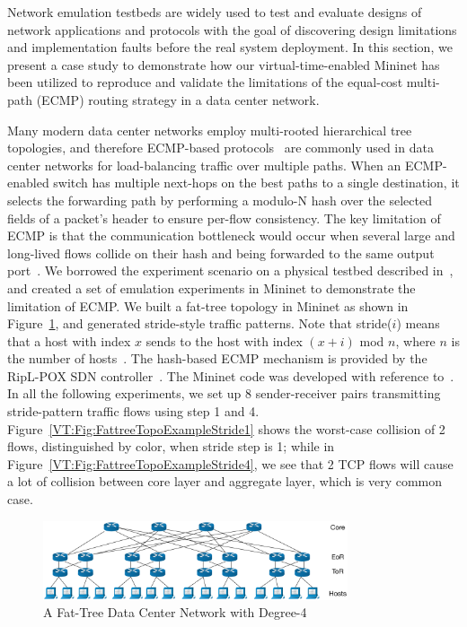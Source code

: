 \label{VT:Sec:CaseStudy}

Network emulation testbeds are widely used to test and evaluate designs of network applications and
protocols with the goal of discovering design limitations and implementation faults before the real system deployment.
In this section, we present a case study to demonstrate how our virtual-time-enabled Mininet has been utilized to
reproduce and validate the limitations of the equal-cost multi-path (ECMP) routing strategy in a data center network.

Many modern data center networks employ multi-rooted hierarchical tree topologies,
and therefore ECMP-based protocols~\cite{ECMP} are commonly used in data center networks for load-balancing traffic over multiple paths.
When an ECMP-enabled switch has multiple next-hops on the best paths to a single destination,
it selects the forwarding path by performing a modulo-N hash over the selected fields of a packet's header to ensure per-flow consistency.
The key limitation of ECMP is that the communication bottleneck would occur when several large and
long-lived flows collide on their hash and being forwarded to the same output port~\cite{Hedera}. 
We borrowed the experiment scenario on a physical testbed described in~\cite{Hedera},
and created a set of emulation experiments in Mininet to demonstrate the limitation of ECMP.
We built a fat-tree topology in Mininet as shown in Figure~\ref{VT:Fig:FattreeTopoExample},
and generated stride-style traffic patterns. Note that stride($i$) means that a host with index $x$ sends to the host with index $(x + i)$ mod $n$,
where $n$ is the number of hosts~\cite{Hedera}. 
The hash-based ECMP mechanism is provided by the RipL-POX SDN controller~\cite{RipLPox}.
The Mininet code was developed with reference to~\cite{ReproNetReserch}.
In all the following experiments, we set up 8 sender-receiver pairs transmitting stride-pattern traffic flows using step 1 and 4.
Figure~\ref{VT:Fig:FattreeTopoExampleStride1} shows the worst-case collision of 2 flows, distinguished by color, when stride step is 1;
while in Figure~\ref{VT:Fig:FattreeTopoExampleStride4}, we see that 2 TCP flows will cause a lot of collision between core layer and aggregate layer,
which is very common case.

\begin{figure}[ht]
    \centering
    \includegraphics[width=0.8\textwidth]{VirtualTime/figures/TopoFatTreeExample.eps}
    \caption{A Fat-Tree Data Center Network with Degree-4}
    \label{VT:Fig:FattreeTopoExample}
\end{figure}

